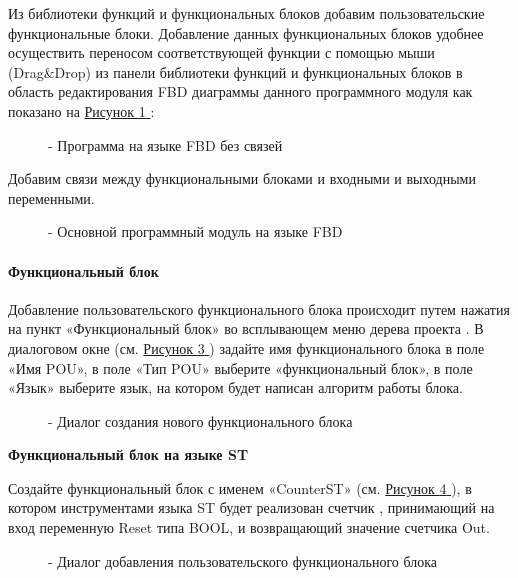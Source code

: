 \documentclass[letterpaper,10pt,russian]{sphinxmanual}
\begin{document}
Из библиотеки функций и функциональных блоков добавим пользовательские
функциональные блоки. Добавление данных функциональных блоков удобнее
осуществить переносом соответствующей функции с помощью мыши (Drag\&Drop)
из панели библиотеки функций и функциональных блоков в область
редактирования FBD диаграммы данного программного модуля как показано
на \hyperref[usage_guide/work_with_project:image156]{Рисунок \ref{usage_guide/work_with_project:image156} }:
\begin{figure}[htbp]
\centering
\capstart

\noindent{}
\caption{- Программа на языке FBD без связей}\label{usage_guide/work_with_project:image156}\end{figure}

Добавим связи между функциональными блоками и входными и выходными
переменными.
\begin{figure}[htbp]
\centering
\capstart

\noindent{}
\caption{- Основной программный модуль на языке FBD}\label{usage_guide/work_with_project:image157}\end{figure}


\paragraph{Функциональный блок}
\label{usage_guide/work_with_project:id9}
Добавление пользовательского функционального блока происходит путем
нажатия на пункт «Функциональный блок» во всплывающем меню дерева
проекта . В диалоговом окне (см. \hyperref[usage_guide/work_with_project:image158]{Рисунок \ref{usage_guide/work_with_project:image158} }) задайте имя
функционального блока в поле «Имя POU», в поле «Тип POU» выберите
«функциональный блок», в поле «Язык» выберите язык, на котором будет
написан алгоритм работы блока.
\begin{figure}[htbp]
\centering
\capstart

\noindent{}
\caption{- Диалог создания нового функционального блока}\label{usage_guide/work_with_project:image158}\end{figure}

\textbf{Функциональный блок на языке ST}

Создайте функциональный блок с именем «CounterST» (см. \hyperref[usage_guide/work_with_project:image159]{Рисунок \ref{usage_guide/work_with_project:image159} }), в
котором инструментами языка ST будет реализован счетчик , принимающий на
вход переменную Reset типа BOOL, и возвращающий значение счетчика Out.
\begin{figure}[htbp]
\centering
\capstart

\noindent{}
\caption{- Диалог добавления пользовательского функционального блока}\label{usage_guide/work_with_project:image159}\end{figure}
\end{document}
